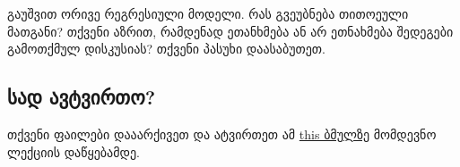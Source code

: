 \documentclass{article}\usepackage[]{graphicx}\usepackage[]{color}
\begin{document}
გაუშვით ორივე რეგრესიული მოდელი. რას გვეუბნება თითოეული მათგანი? თქვენი აზრით, რამდენად ეთანხმება ან არ ეთნახმება შედეგები გამოთქმულ დისკუსიას? თქვენი პასუხი დაასაბუთეთ.



\subsection*{სად ავტვირთო?}

თქვენი ფაილები დააარქივეთ და ატვირთეთ ამ \href{https://www.dropbox.com/request/BwSLTTZBx4CwwJ6jgts9}{this ბმულზე} მომდევნო ლექციის დაწყებამდე.
\end{document}
